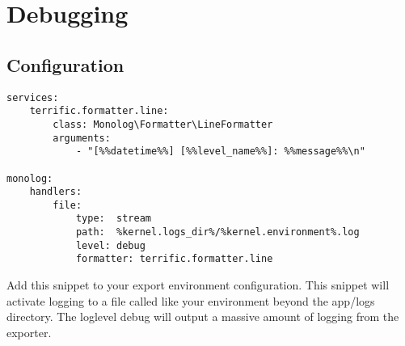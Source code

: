\section{Debugging}

\subsection{Configuration}

\begin{verbatim}
services:
    terrific.formatter.line:
        class: Monolog\Formatter\LineFormatter
        arguments:
            - "[%%datetime%%] [%%level_name%%]: %%message%%\n"

monolog:
    handlers:
        file:
            type:  stream
            path:  %kernel.logs_dir%/%kernel.environment%.log
            level: debug
            formatter: terrific.formatter.line
\end{verbatim}

\noindent
Add this snippet to your export environment configuration.
This snippet will activate logging to a file called like your environment beyond the app/logs directory.
The loglevel debug will output a massive amount of logging from the exporter.
